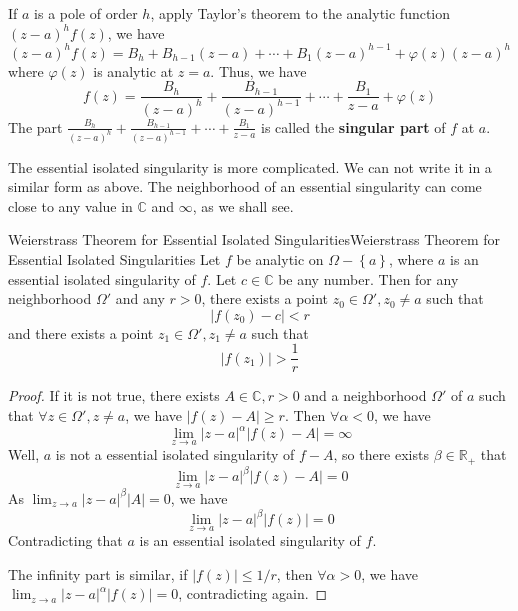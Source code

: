\documentclass[../main.tex]{subfiles}
\begin{document}
If $a$ is a pole of order $h$, apply Taylor's theorem to the analytic function $(z-a)^hf(z)$, we have
\begin{equation*}
	(z-a)^hf(z) = B_h + B_{h-1}(z-a) + \cdots + B_1(z-a)^{h-1} + \varphi(z) (z-a)^h
\end{equation*}
where $\varphi(z)$ is analytic at $z=a$. Thus, we have
\begin{equation}
	f(z) = \frac{B_h}{(z-a)^h} + \frac{B_{h-1}}{(z-a)^{h-1}} + \cdots + \frac{B_1}{z-a} + \varphi(z)
\end{equation}
The part $\displaystyle \frac{B_h}{(z-a)^h} + \frac{B_{h-1}}{(z-a)^{h-1}} + \cdots + \frac{B_1}{z-a}$ is called the \textbf{singular part} of $f$ at $a$.


The essential isolated singularity is more complicated. We can not write it in a similar form as above. The neighborhood of an essential singularity can come close to any value in $\mathbb{C}$ and $\infty $, as we shall see.

\begin{theorem}{Weierstrass Theorem for Essential Isolated Singularities}{Weierstrass Theorem for Essential Isolated Singularities}
	Let $f$ be analytic on $\Omega-\left\{ a \right\}$, where $a$ is an essential isolated singularity of $f$. Let $c\in \mathbb{C}$ be any number. Then for any neighborhood $\Omega'$ and any $r>0$, there exists a point $z_0\in \Omega',z_0\neq a$ such that
	\begin{equation*}
		\left|f(z_0)-c\right| < r
	\end{equation*}
	and there exists a point $z_1\in \Omega',z_1\neq a$ such that
	\begin{equation*}
		\left|f(z_1)\right| > \frac{1}{r}
	\end{equation*}
\end{theorem}
\begin{proof}
	If it is not true, there exists $A\in \mathbb{C},r>0$ and a neighborhood $\Omega'$ of $a$ such that $\forall z\in \Omega',z\neq a$, we have $\left|f(z)-A\right| \geq r$. Then $\forall \alpha<0$, we have
	\begin{equation*}
		\lim_{z \to a} \left|z-a\right|^{\alpha} \left|f(z)-A\right| = \infty 
	\end{equation*}
	Well, $a$ is not a essential isolated singularity of $f-A$, so there exists $\beta\in \mathbb{R}_+$ that
	\begin{equation*}
		\lim_{z \to a} \left|z-a\right|^{\beta} \left|f(z)-A\right| = 0
	\end{equation*}
	As $\lim_{z \to a} \left|z-a\right|^{\beta}\left|A\right| = 0$, we have
	\begin{equation*}
		\lim_{z \to a} \left|z-a\right|^{\beta} \left|f(z)\right| = 0
	\end{equation*}
	Contradicting that $a$ is an essential isolated singularity of $f$.

	The infinity part is similar, if $\left|f(z)\right| \leq 1 / r$, then $\forall \alpha>0$, we have $\lim_{z \to a} \left|z-a\right|^{\alpha} \left|f(z)\right| = 0$, contradicting again.
\end{proof}
\end{document}
